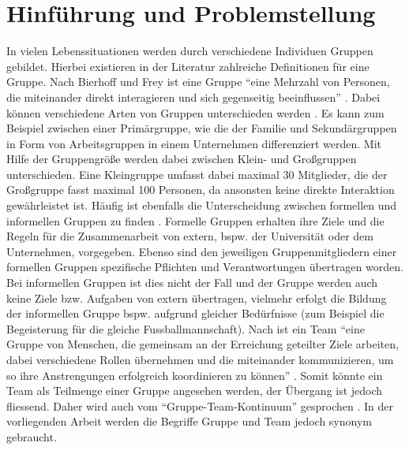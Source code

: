 \vspace{-0.7cm}
\chapter{Hinführung und Problemstellung}
\label{kap1_hinfuehrung_problemstellung}

In vielen Lebenssituationen werden durch verschiedene Individuen Gruppen gebildet. Hierbei existieren in der Literatur zahlreiche Definitionen für eine Gruppe. Nach Bierhoff und Frey ist eine Gruppe “eine Mehrzahl von Personen, die miteinander direkt interagieren und sich gegenseitig beeinflussen”  \citep[S.~638]{bierhoff_handbuch_2006}.
\newline\newline
Dabei können verschiedene Arten von Gruppen unterschieden werden \citep[Vgl. zum folgenden Abschnitt][S.~11ff.]{thomas_grundris_1991}. Es kann zum Beispiel zwischen einer Primärgruppe, wie die der Familie und Sekundärgruppen in Form von Arbeitsgruppen in einem Unternehmen differenziert werden. Mit Hilfe der Gruppengröße werden dabei zwischen Klein- und Großgruppen unterschieden. Eine Kleingruppe umfasst dabei maximal 30 Mitglieder, die der Großgruppe fasst maximal 100 Personen, da ansonsten keine direkte Interaktion gewährleistet ist.
\newline\newline 
Häufig ist ebenfalls die Unterscheidung zwischen formellen und informellen Gruppen zu finden \citep[Vgl. zum folgenden Abschnitt][S.~48]{spies_organisationspsychologie_2010}.
Formelle Gruppen erhalten ihre Ziele und die Regeln für die Zusammenarbeit von extern, bspw. der Universität oder dem Unternehmen, vorgegeben. Ebenso sind den jeweiligen Gruppenmitgliedern einer formellen Gruppen spezifische Pflichten und Verantwortungen übertragen worden. Bei informellen Gruppen ist dies nicht der Fall und der Gruppe werden auch keine Ziele bzw. Aufgaben von extern übertragen, vielmehr erfolgt die Bildung der informellen Gruppe bspw. aufgrund gleicher Bedürfnisse (zum Beispiel die Begeisterung für die gleiche Fussballmannschaft). 
\newline\newline
Nach \citet{dick_teamwork_2013} ist ein Team "`eine Gruppe von Menschen, die gemeinsam an der Erreichung geteilter Ziele arbeiten, dabei verschiedene Rollen übernehmen und die miteinander kommunizieren, um so ihre Anstrengungen erfolgreich koordinieren zu können"' \citep[S.~1]{dick_teamwork_2013}. Somit könnte ein Team als Teilmenge einer Gruppe angesehen werden, der Übergang ist jedoch fliessend. Daher wird auch vom "`Gruppe-Team-Kontinuum"' gesprochen \citep[Vgl.][S.~14]{brettel_erfolgreiche_2009}. In der vorliegenden Arbeit werden die Begriffe Gruppe und Team jedoch synonym gebraucht.
